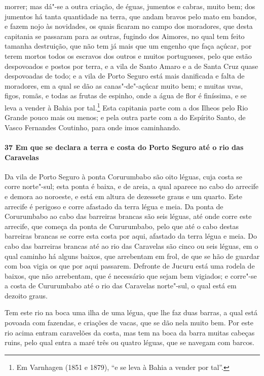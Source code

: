 morrer; mas dá"-se a outra criação, de éguas, jumentos e cabras, muito bem; dos jumentos há
tanta quantidade na terra, que andam bravos pelo mato em bandos, e fazem nojo às
novidades, os quais ficaram no campo dos moradores, que desta capitania se passaram para
as outras, fugindo dos Aimores, no qual tem feito tamanha destruição, que não tem já mais
que um engenho que faça açúcar, por terem mortos todos os escravos dos outros e muitos
portugueses, pelo que estão despovoados e postos por terra, e a vila de Santo Amaro e a de
Santa Cruz quase despovoadas de todo; e a vila de Porto Seguro está mais danificada e
falta de moradores, em a qual se dão as canas"-de"-açúcar muito bem; e muitas uvas, figos,
romãs, e todas as frutas de espinho, onde a água de flor é finíssima, e se leva a vender à
Bahia por tal.\footnote{ Em Varnhagen (1851 e 1879), ``e se leva à Bahia a vender por
tal''.} Esta capitania parte com a dos Ilheos pelo Rio Grande pouco mais ou menos; e pela
outra parte com a do Espírito Santo, de Vasco Fernandes Coutinho, para onde imos
caminhando.

\paragraph{37 Em que se declara a terra e costa do Porto Seguro até o rio das Caravelas}

Da vila de Porto Seguro à ponta Corurumbabo são oito léguas, cuja costa se corre
norte"-sul; esta ponta é baixa, e de areia, a qual aparece no cabo do arrecife e demora ao
noroeste, e está em altura de dezessete graus e um quarto. Este arrecife é perigoso e
corre afastado da terra légua e meia. Da ponta de Corurumbabo ao cabo das barreiras
brancas são seis léguas, até onde corre este arrecife, que começa da ponta de Cururumbabo,
pelo que até o cabo destas barreiras brancas se corre esta costa por aqui, afastado da
terra légua e meia. Do cabo das barreiras brancas até ao rio das Caravelas são cinco ou
seis léguas, em o qual caminho há alguns baixos, que arrebentam em frol, de que se hão de
guardar com boa vigia os que por aqui passarem. Defronte de Jucuru está uma rodela de
baixos, que não arrebentam, que é necessário que sejam bem vigiados; e corre"-se a costa de
Cururumbabo até o rio das Caravelas norte"-sul, o qual está em dezoito graus.

Tem este rio na boca uma ilha de uma légua, que lhe faz duas barras, a qual está povoada
com fazendas, e criações de vacas, que se dão nela muito bem. Por este rio acima entram
caravelões da costa, mas tem na boca da barra muitas cabeças ruins, pelo qual entra a maré
três ou quatro léguas, que se navegam com barcos.

